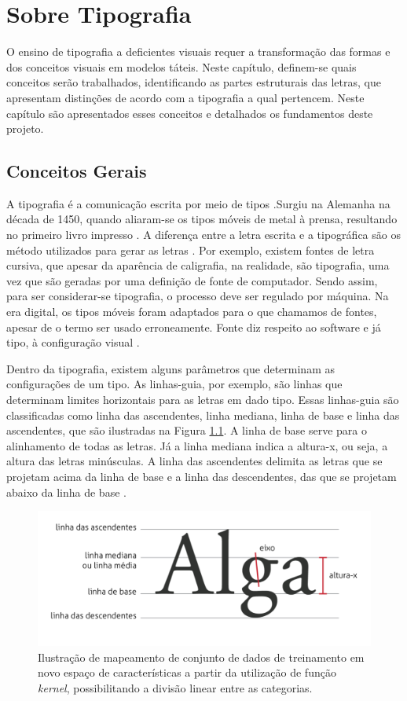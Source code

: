 \chapter{Sobre Tipografia}
\label{ch:Tipografia}

O ensino de tipografia a deficientes visuais requer a transformação das formas e dos conceitos visuais em modelos táteis. Neste capítulo, definem-se quais conceitos serão trabalhados, identificando as partes estruturais das letras, que apresentam distinções de acordo com a tipografia a qual pertencem. Neste capítulo são apresentados esses conceitos e detalhados os fundamentos deste projeto.

\section{Conceitos Gerais}

A tipografia é a comunicação escrita por meio de tipos .Surgiu na Alemanha na década de 1450, quando aliaram-se os tipos móveis de metal à prensa, resultando no primeiro livro impresso .  A diferença entre a letra escrita e a tipográfica são os método utilizados para gerar as letras . Por exemplo, existem fontes de letra cursiva, que apesar da aparência de caligrafia, na realidade, são tipografia, uma vez que são geradas por uma definição de fonte de computador.  Sendo assim, para ser considerar-se tipografia, o processo deve ser regulado por máquina. Na era digital, os tipos móveis foram adaptados para o que chamamos de fontes, apesar de o termo ser usado erroneamente. Fonte diz respeito ao software e já tipo, à configuração visual .

Dentro da tipografia, existem alguns parâmetros que determinam as configurações de um tipo. As linhas-guia, por exemplo, são linhas que determinam limites horizontais para as letras em dado tipo. Essas linhas-guia são classificadas como linha das ascendentes, linha mediana, linha de base e linha das ascendentes, que são ilustradas na Figura  \ref{fig:linhas}. A linha de base serve para o alinhamento de todas as letras. Já a linha mediana indica a altura-x, ou seja, a altura das letras minúsculas. A linha das ascendentes delimita as letras que se projetam acima da linha de base e a linha das descendentes, das que se projetam abaixo da linha de base .

\begin{figure}[H]
 \centering
  \includegraphics[width=0.75\linewidth]{figuras/linhas.pdf}
  \caption{Ilustração de mapeamento de conjunto de dados de treinamento em novo espaço de características a partir da utilização de função \textit{kernel}, possibilitando a divisão linear entre as categorias.}
  \label{fig:linhas}
\end{figure}


